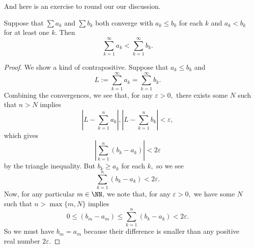 \documentclass[../notes.tex]{subfiles}
\begin{document}
And here is an exercise to round our our discussion.
\begin{exercise}[Ross 16.13]
	Suppose that $\sum a_k$ and $\sum b_k$ both converge with $a_k\le b_k$ for each $k$ and $a_k<b_k$ for at least one $k.$ Then
	\[\sum_{k=1}^\infty a_k<\sum_{k=1}^\infty b_k.\]
\end{exercise}
\begin{proof}
	We show a kind of contrapositive. Suppose that $a_k\le b_k$ and
	\[L:=\sum_{k=1}^\infty a_k=\sum_{k=1}^\infty b_k.\]
	Combining the convergences, we see that, for any $\varepsilon>0,$ there exists some $N$ such that $n>N$ implies
	\[\left|L-\sum_{k=1}^na_k\right|,\left|L-\sum_{k=1}^nb_k\right|<\varepsilon,\]
	which gives
	\[\left|\sum_{k=1}^n(b_k-a_k)\right|<2\varepsilon\]
	by the triangle inequality. But $b_k\ge a_k$ for each $k,$ so we see
	\[\sum_{k=1}^n(b_k-a_k)<2\varepsilon.\]
	Now, for any particular $m\in\NN,$ we note that, for any $\varepsilon>0,$ we have some $N$ such that $n>\max\{m,N\}$ implies
	\[0\le(b_m-a_m)\le\sum_{k=1}^n(b_k-a_k)<2\varepsilon.\]
	So we must have $b_m=a_m$ because their difference is smaller than any positive real number $2\varepsilon.$
\end{proof}
\end{document}
